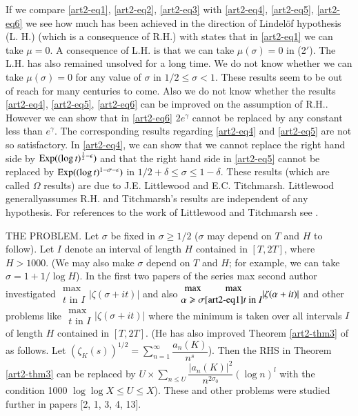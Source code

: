 If we compare \eqref{art2-eq1}, \eqref{art2-eq2}, \eqref{art2-eq3} with \eqref{art2-eq4}, \eqref{art2-eq5}, \eqref{art2-eq6} we see how much has been achieved in the direction of Lindel\"of hypothesis (L. H.) (which is a consequence of R.H.) with states that in \eqref{art2-eq1} we can take $\mu=0$. A consequence of L.H. is that we can take $\mu(\sigma) = 0$ in (2$'$). The L.H. has also remained unsolved for a long time. We do not know whether we can take $\mu(\sigma)=0$ for any value of $\sigma$ in $1/2 \leqslant \sigma < 1$. These results seem to be out of reach for many centuries to come. Also we do not know whether the results \eqref{art2-eq4}, \eqref{art2-eq5}, \eqref{art2-eq6} can be improved on the assumption of R.H.. However we can show that in \eqref{art2-eq6} $2e^\gamma$ cannot be replaced by any constant less than $e^\gamma$. The corresponding results regarding \eqref{art2-eq4} and \eqref{art2-eq5} are not so satisfactory. In \eqref{art2-eq4}, we can show that we cannot replace the right hand side by $\operatorname{Exp} ((\log t)^{\frac{1}{2}- \epsilon})$  and that the right hand side in \eqref{art2-eq5} cannot be replaced by $\operatorname{Exp} ((\log t)^{1-\sigma -\epsilon})$ in $1/2 + \delta \leqslant \sigma \leqslant 1 -\delta$. These results (which are called $\Omega$ results) are due to J.E. Littlewood and E.C. Titchmarsh. Littlewood generally\pageoriginale assumes R.H. and Titchmarsh's results are independent of any hypothesis. For references to the work of Littlewood and Titchmarsh see \cite{art2-key19}.

\medskip
\noindent
THE PROBLEM. Let $\sigma$ be fixed in $\sigma \geqslant 1/2$ ($\sigma$ may depend on $T$ and $H$ to follow). Let $I$ denote an interval of length $H$ contained in $[T, 2T]$, where $H > 1000$. (We may also make $\sigma$ depend on $T$ and $H$; for example, we can take $\sigma =1 +1 /\log H$). In the first two papers \cite{art2-key11, art2-key12} of the series max second author investigated $\begin{matrix} \max \\  t \text{ in } I\end{matrix} |\zeta(\sigma + it)|$ and also $\begin{matrix} \max\\ \alpha \geqslant \sigma 
\end{matrix} \begin{matrix}
\max\\\eqref{art2-eq1}
t \text{ in } I
\end{matrix} |\zeta(\alpha + it)|$ and other problems like $\begin{matrix}
\max\\
t \text{ in } I
\end{matrix} |\zeta(\sigma + it)|$ where the minimum is taken over all intervals $I$ of length $H$ contained in $[T, 2T]$. (He has also improved Theorem \ref{art2-thm3} of \cite{art2-key11} as follows. Let $(\zeta_K(s))^{1/2} = \sum\limits^\infty_{n=1} \dfrac{a_n(K)}{n^s}$). Then the RHS in Theorem \ref{art2-thm3} can be replaced by $U \times \sum\limits_{n \leqslant U} \dfrac{|a_n(K)|^2}{n^{2\sigma_0}} (\log n)^l$  with the condition 1000 $\log \log X \leqslant U \leqslant X$). These and other problems were studied further in papers [2, 1, 3, 4, 13].


